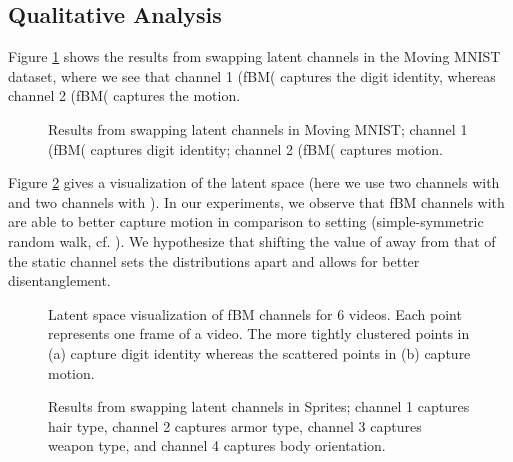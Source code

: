 \documentclass[runningheads]{llncs}
\begin{document}
   \subsection{Qualitative Analysis}
      
   Figure \ref{bmnist} shows the results from swapping latent channels in the Moving MNIST dataset, where we see that channel 1 (fBM( captures the digit identity, whereas channel 2 (fBM( captures the motion. \par 

   \begin{figure} [H]
    \centering
   \caption{Results from swapping latent channels in Moving MNIST; channel 1 (fBM( captures digit identity; channel 2 (fBM( captures motion.}
   \label{bmnist}
   \end{figure}

   Figure \ref{fig:latent_vis} gives a visualization of the latent space (here we use two channels with  and two channels with ). In our experiments, we observe that fBM channels with  are able to better capture motion in comparison to setting  (simple-symmetric random walk, cf. \cite{Grathwohl2016DisentanglingSA}). We hypothesize that shifting the value of  away from that of the static channel sets the distributions apart and allows for better disentanglement. \par

   \begin{figure} [H]
   \centering  
   \caption{Latent space visualization of fBM channels for 6 videos. Each point represents one frame of a video. The more tightly clustered points in (a) capture digit identity whereas the scattered points in (b) capture motion.}
   \label{fig:latent_vis}
   \end{figure}
   
   \begin{figure} [H]
   \centering  
   \caption{Results from swapping latent channels in Sprites; channel 1 captures hair type, channel 2 captures armor type, channel 3 captures weapon type, and channel 4 captures body orientation.}
   \label{sprites}
   \end{figure}
 
\end{document}

